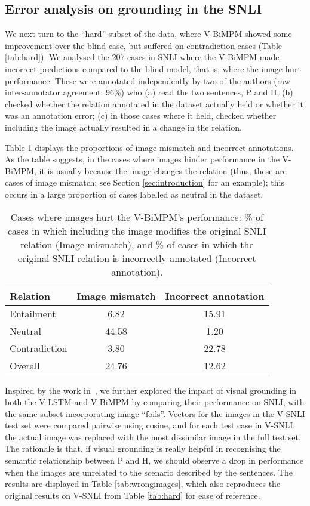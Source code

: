 \documentclass[11pt]{article}
\begin{document}
\subsection{Error analysis on grounding in the SNLI}
We next turn to the ``hard'' subset of the data, where V-BiMPM showed some improvement 
over the blind case, but suffered on contradiction cases (Table \ref{tab:hard}). 
We analysed the 207 cases in SNLI where the
V-BiMPM made incorrect predictions compared to the blind model, that
is, where the image hurt performance. These were annotated
independently by two of the authors (raw inter-annotator agreement:
96\%) who (a) read the two sentences, P and H; (b) checked whether the
relation annotated in the dataset actually held or whether it was an
annotation error; (c) in those cases where it held, 
checked whether including the image actually resulted in a change in
the relation. 

Table \ref{tab:hard-mismatch} displays the proportions
of image mismatch and incorrect annotations. As the table suggests, in the cases where images hinder performance in
the V-BiMPM, it is usually because the image changes the relation
(thus, these are cases of image mismatch; see Section \ref{sec:introduction} for an example); this occurs in a large proportion of cases labelled
as neutral in the dataset.

\begin{table}
\small
\begin{center}
\begin{tabular}{|l|c|c|}
\hline
Relation & Image mismatch & Incorrect annotation \\
\hline
Entailment & 6.82 & 15.91 \\
Neutral & 44.58 & 1.20 \\
Contradiction & 3.80 & 22.78 \\
\hline
Overall & 24.76 & 12.62 \\
\hline
\end{tabular}
\caption{Cases where images hurt the V-BiMPM's performance: \% of
  cases in which including the image modifies the original SNLI relation (Image mismatch), and
 \% of cases in which the original SNLI relation is incorrectly annotated (Incorrect annotation).}\label{tab:hard-mismatch}
\end{center}
\end{table}


Inspired by the work in~\cite{miro:exam17}, we further explored the impact of visual grounding in both the V-LSTM
and V-BiMPM by comparing their performance on SNLI, with the
same subset incorporating image ``foils''. Vectors for the images in the
V-SNLI test set were compared pairwise using cosine, and for each test
case in V-SNLI, the actual image was replaced with the most
dissimilar image in the full test set.  The rationale is that, if
visual grounding is really helpful in recognising the semantic
relationship between P and H, we should observe a drop in performance
when the images are unrelated to the scenario described by the
sentences. The results are displayed in Table \ref{tab:wrongimages}, which also reproduces the original results on V-SNLI from Table \ref{tab:hard} for ease of reference.
\end{document}
